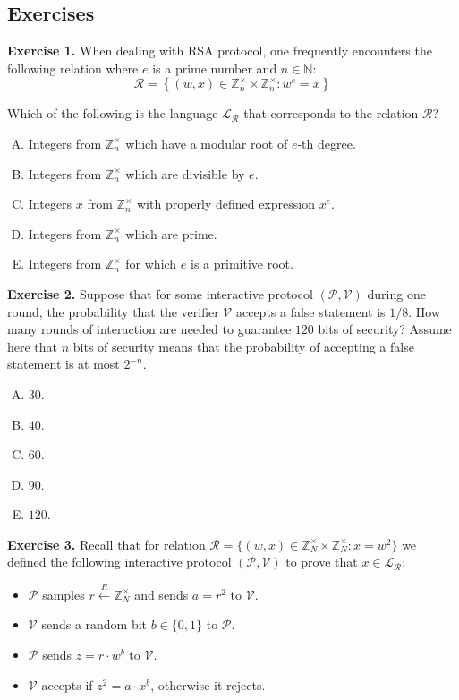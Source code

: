 \documentclass[../lecture-notes.tex]{subfiles}
\begin{document}
\subsection{Exercises}

\textbf{Exercise 1.} When dealing with RSA protocol, one frequently encounters the following relation where $e$ is a prime number and $n \in \mathbb{N}$:
\begin{equation*}
    \mathcal{R} = \left\{ (w, x) \in \mathbb{Z}_n^{\times} \times \mathbb{Z}_n^{\times}: w^e = x \right\}
\end{equation*}

Which of the following is the language $\mathcal{L}_{\mathcal{R}}$ that corresponds to the relation $\mathcal{R}$?
\begin{enumerate}[(A)]
    \item Integers from $\mathbb{Z}_n^{\times}$ which have a modular root of $e$-th degree.
    \item Integers from $\mathbb{Z}_n^{\times}$ which are divisible by $e$.
    \item Integers $x$ from $\mathbb{Z}_n^{\times}$ with properly defined expression $x^e$.
    \item Integers from $\mathbb{Z}_n^{\times}$ which are prime.
    \item Integers from $\mathbb{Z}_n^{\times}$ for which $e$ is a primitive root.
\end{enumerate}

\textbf{Exercise 2.} Suppose that for some interactive protocol $(\mathcal{P}, \mathcal{V})$ during one round, the probability that the verifier $\mathcal{V}$ accepts a false statement is $1/8$. How many rounds of interaction are needed to guarantee $120$ bits of security? Assume here that $n$ bits of security means that the probability of accepting a false statement is at most $2^{-n}$.
\begin{enumerate}[(A)]
    \item $30$.
    \item $40$.
    \item $60$.
    \item $90$.
    \item $120$.
\end{enumerate}

\textbf{Exercise 3.} Recall that for relation $\mathcal{R} = \{(w,x) \in \mathbb{Z}_N^{\times} \times \mathbb{Z}_N^{\times}: x = w^2\}$ we defined the following interactive protocol $(\mathcal{P}, \mathcal{V})$ to prove that $x \in \mathcal{L}_{\mathcal{R}}$:
\begin{itemize}
    \item $\mathcal{P}$ samples $r \xleftarrow{R} \mathbb{Z}_N^{\times}$ and sends $a = r^2$ to $\mathcal{V}$.
    \item $\mathcal{V}$ sends a random bit $b \in \{0,1\}$ to $\mathcal{P}$.
    \item $\mathcal{P}$ sends $z = r \cdot w^b$ to $\mathcal{V}$.
    \item $\mathcal{V}$ accepts if $z^2 = a \cdot x^b$, otherwise it rejects.
\end{itemize}
\end{document}
